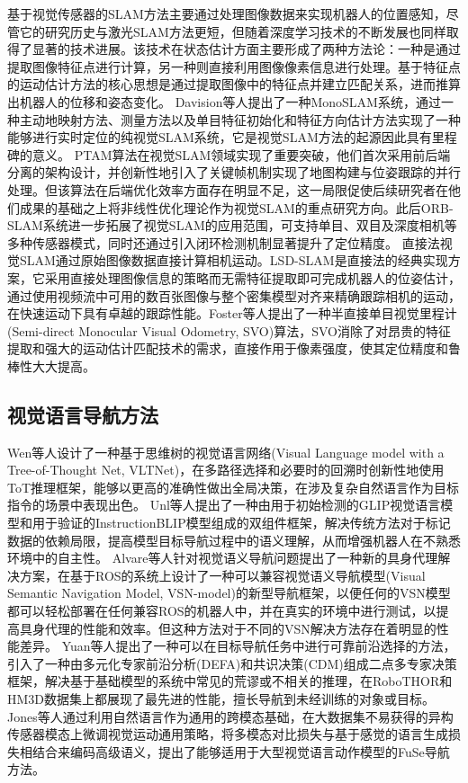 	基于视觉传感器的SLAM方法主要通过处理图像数据来实现机器人的位置感知，尽管它的研究历史与激光SLAM方法更短，但随着深度学习技术的不断发展也同样取得了显著的技术进展。该技术在状态估计方面主要形成了两种方法论：一种是通过提取图像特征点进行计算，另一种则直接利用图像像素信息进行处理。基于特征点的运动估计方法的核心思想是通过提取图像中的特征点并建立匹配关系，进而推算出机器人的位移和姿态变化。
	Davision\cite{davison2007monoslam, davison2003real}等人提出了一种MonoSLAM系统，通过一种主动地映射方法、测量方法以及单目特征初始化和特征方向估计方法实现了一种能够进行实时定位的纯视觉SLAM系统，它是视觉SLAM方法的起源因此具有里程碑的意义。
	PTAM\cite{klein2007parallel}算法在视觉SLAM领域实现了重要突破，他们首次采用前后端分离的架构设计，并创新性地引入了关键帧机制实现了地图构建与位姿跟踪的并行处理。但该算法在后端优化效率方面存在明显不足，这一局限促使后续研究者在他们成果的基础之上将非线性优化理论作为视觉SLAM的重点研究方向。此后ORB-SLAM\cite{mur2015orb}系统进一步拓展了视觉SLAM的应用范围，可支持单目、双目及深度相机等多种传感器模式，同时还通过引入闭环检测机制显著提升了定位精度。
	直接法视觉SLAM通过原始图像数据直接计算相机运动。LSD-SLAM\cite{newcombe2011dtam}是直接法的经典实现方案，它采用直接处理图像信息的策略而无需特征提取即可完成机器人的位姿估计，通过使用视频流中可用的数百张图像与整个密集模型对齐来精确跟踪相机的运动，在快速运动下具有卓越的跟踪性能。Foster\cite{forster2014svo}等人提出了一种半直接单目视觉里程计(Semi-direct Monocular Visual Odometry, SVO)算法，SVO消除了对昂贵的特征提取和强大的运动估计匹配技术的需求，直接作用于像素强度，使其定位精度和鲁棒性大大提高。





\subsection{视觉语言导航方法}
	Wen\cite{wen2025zero}等人设计了一种基于思维树的视觉语言网络(Visual Language model with a Tree-of-Thought Net, VLTNet)，在多路径选择和必要时的回溯时创新性地使用ToT推理框架，能够以更高的准确性做出全局决策，在涉及复杂自然语言作为目标指令的场景中表现出色。
	Unl\cite{unlu2025reliable}等人提出了一种由用于初始检测的GLIP视觉语言模型和用于验证的InstructionBLIP模型组成的双组件框架，解决传统方法对于标记数据的依赖局限，提高模型目标导航过程中的语义理解，从而增强机器人在不熟悉环境中的自主性。
	Alvare\cite{gutierrez2025visual}等人针对视觉语义导航问题提出了一种新的具身代理解决方案，在基于ROS的系统上设计了一种可以兼容视觉语义导航模型(Visual Semantic Navigation Model, VSN-model)的新型导航框架，以便任何的VSN模型都可以轻松部署在任何兼容ROS的机器人中，并在真实的环境中进行测试，以提高具身代理的性能和效率。但这种方法对于不同的VSN解决方法存在着明显的性能差异。
	Yuan\cite{yuan2025exploring}等人提出了一种可以在目标导航任务中进行可靠前沿选择的方法，引入了一种由多元化专家前沿分析(DEFA)和共识决策(CDM)组成二点多专家决策框架，解决基于基础模型的系统中常见的荒谬或不相关的推理，在RoboTHOR和HM3D数据集上都展现了最先进的性能，擅长导航到未经训练的对象或目标。
	Jones\cite{jones2025beyond}等人通过利用自然语言作为通用的跨模态基础，在大数据集不易获得的异构传感器模态上微调视觉运动通用策略，将多模态对比损失与基于感觉的语言生成损失相结合来编码高级语义，提出了能够适用于大型视觉语言动作模型的FuSe导航方法。
	
